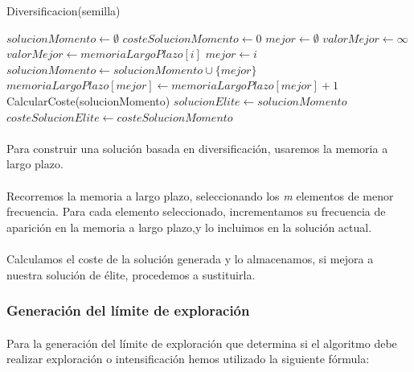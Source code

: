 \documentclass{article}
\begin{document}
		\begin{algorithm}[H]
			\caption{Diversificacion(semilla)}
			\begin{algorithmic}
				\STATE $solucionMomento \leftarrow \emptyset$
				\STATE $costeSolucionMomento \leftarrow 0$
				\STATE $mejor \leftarrow \emptyset$
				\STATE $valorMejor \leftarrow \infty$
				\STATE $valorMejor \leftarrow memoriaLargoPlazo[i]$
				\STATE $mejor \leftarrow i$
				\ENDIF
				\ENDFOR
				\STATE $solucionMomento \leftarrow solucionMomento \cup \{mejor\}$
				\STATE $memoriaLargoPlazo[mejor] \leftarrow memoriaLargoPlazo[mejor]+1$
				\ENDWHILE
				\STATE CalcularCoste(solucionMomento)
				\STATE $solucionElite \leftarrow solucionMomento$
				\STATE $costeSolucionElite \leftarrow costeSolucionMomento$
				\ENDIF
			\end{algorithmic}
		\end{algorithm}
		
		\paragraph{}Para construir una solución basada en diversificación, usaremos la memoria a largo plazo.
		
		\paragraph{}Recorremos la memoria a largo plazo, seleccionando los \emph{m} elementos de menor frecuencia. Para cada elemento seleccionado, incrementamos su frecuencia de aparición en la memoria a largo plazo,y lo incluimos en la solución actual.
		
		\paragraph{}Calculamos el coste de la solución generada y lo almacenamos, si mejora a nuestra solución de élite, procedemos a sustituirla. 
		
		\subsubsection{Generación del límite de exploración}
		
		\paragraph{}Para la generación del límite de exploración que determina si el algoritmo debe realizar exploración o intensificación hemos utilizado la siguiente fórmula:
		
\end{document}
